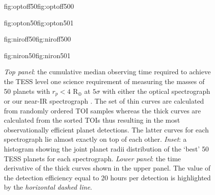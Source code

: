 \begin{figure}
  \centering
  \hspace{-\hsize}%
  \begin{ocg}{fig:optoff50}{fig:optoff50}{0}%
  \end{ocg}%
  \begin{ocg}{fig:opton50}{fig:opton50}{1}%
  \end{ocg}
  \hspace{-\hsize}%
  \begin{ocg}{fig:niroff50}{fig:niroff50}{0}%
  \end{ocg}%
  \begin{ocg}{fig:niron50}{fig:niron50}{1}%
  \end{ocg}
  \hspace{-\hsize}%
  \caption{\emph{Top panel}: the cumulative median observing time required to achieve
    the TESS level one science requirement of measuring the masses of 50 planets with
    $r_p <4$ R$_{\oplus}$ at $5\sigma$ with either the optical spectrograph
     or our
    near-IR spectrograph 
    . The set of 
    thin curves are calculated
    from randomly ordered TOI samples whereas the thick curves are calculated from the sorted
    TOIs thus resulting in the most observationally efficient planet detections. The latter curves
    for each spectrograph lie almost exactly on top of each other. \emph{Inset}: a histogram showing the
    joint planet radii distribution of the `best' 50 TESS planets for each spectrograph.
    \emph{Lower panel}: the time derivative of the thick curves shown in the upper panel.
    The value of the detection efficiency equal to 20 hours per detection is highlighted
    by the \emph{horizontal dashed line}.}
  \label{fig:50}
\end{figure}

